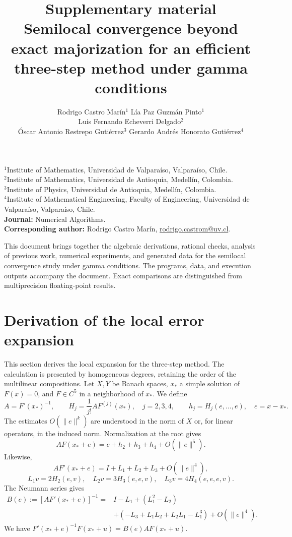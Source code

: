 \documentclass[11pt,a4paper]{article}
\title{Supplementary material\\[4pt]\large
Semilocal convergence beyond exact majorization for an efficient three-step method under gamma conditions}
\author{Rodrigo Castro Marín$^1$ \quad Lía Paz Guzmán Pinto$^1$\\
Luis Fernando Echeverri Delgado$^2$\\
Óscar Antonio Restrepo Gutiérrez$^3$ \quad Gerardo Andrés Honorato Gutiérrez$^4$}
\date{}
\numberwithin{equation}{section}
\numberwithin{table}{section}
\theoremstyle{plain}
\theoremstyle{definition}\newtheorem{definition}[theorem]{Definition}
\theoremstyle{remark}\newtheorem{remark}[theorem]{Remark}
\begin{document}
\maketitle
\noindent\small
$^1$Institute of Mathematics, Universidad de Valparaíso, Valparaíso, Chile.\\
$^2$Institute of Mathematics, Universidad de Antioquia, Medellín, Colombia.\\
$^3$Institute of Physics, Universidad de Antioquia, Medellín, Colombia.\\
$^4$Institute of Mathematical Engineering, Faculty of Engineering,
Universidad de Valparaíso, Valparaíso, Chile.\\[3pt]
\textbf{Journal:} Numerical Algorithms.\\
\textbf{Corresponding author:} Rodrigo Castro Marín,
\href{mailto:rodrigo.castrom@uv.cl}{rodrigo.castrom@uv.cl}.\\
\normalsize\medskip

This document brings together the algebraic derivations, rational
checks, analysis of previous work, numerical experiments, and generated
data for the semilocal convergence study under gamma conditions.
The programs, data, and execution outputs accompany the document.
Exact comparisons are distinguished from multiprecision floating-point
results.

\setcounter{tocdepth}{2}
\tableofcontents
\clearpage
\section{Derivation of the local error expansion}\label{supp:local-error}
This section derives the local expansion for the three-step method.
The calculation is presented by homogeneous degrees, retaining the
order of the multilinear compositions. Let $X,Y$ be Banach spaces,
$x_*$ a simple solution of $F(x)=0$, and $F\in C^5$ in a neighborhood
of $x_*$. We define
\[
 A=F'(x_*)^{-1},\qquad H_j=\frac1{j!}AF^{(j)}(x_*),\quad j=2,3,4,
 \qquad h_j=H_j(e,\ldots,e),\quad e=x-x_*.
\]
The estimates $O(\|e\|^k)$ are understood in the norm of $X$ or, for
linear operators, in the induced norm. Normalization at the root gives
\begin{equation}
 AF(x_*+e)=e+h_2+h_3+h_4+O(\|e\|^5).
 \label{supp:eq:local-F}
\end{equation}
Likewise,
\[
 AF'(x_*+e)=I+L_1+L_2+L_3+O(\|e\|^4),
\]
\[
 L_1v=2H_2(e,v),\quad L_2v=3H_3(e,e,v),\quad L_3v=4H_4(e,e,e,v).
\]
The Neumann series gives
\begin{equation}
 \begin{aligned}
 B(e):=[AF'(x_*+e)]^{-1}
 ={}&I-L_1+(L_1^2-L_2)\\
 &+(-L_3+L_1L_2+L_2L_1-L_1^3)+O(\|e\|^4).
 \end{aligned}\label{supp:eq:local-inverse}
\end{equation}
We have $F'(x_*+e)^{-1}F(x_*+u)=B(e)AF(x_*+u)$.
\end{document}
